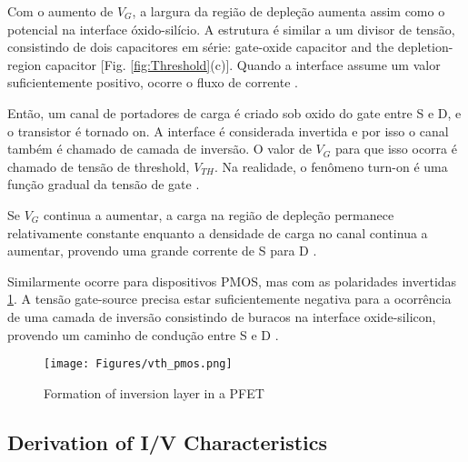 \documentclass[10pt, conference,a4paper]{IEEEtran}
\begin{document}
Com o aumento de $V_G$, a largura da região de depleção aumenta assim como o potencial na interface óxido-silício. A estrutura é similar a um divisor de tensão, consistindo de dois capacitores em série: gate-oxide capacitor and the depletion-region capacitor [Fig. \ref{fig:Threshold}(c)]. Quando a interface assume um valor suficientemente positivo, ocorre o fluxo de corrente \cite{razavi2005design}.

Então, um canal de portadores de carga é criado sob oxido do gate entre S e D, e o transistor é tornado on. A interface é considerada invertida e por isso o canal também é chamado de camada de inversão. O valor de $V_G$ para que isso ocorra é chamado de tensão de threshold, $V_{TH}$. Na realidade, o fenômeno turn-on é uma função gradual da tensão de gate \cite{razavi2005design}. 

Se $V_G$ continua a aumentar, a carga na região de depleção permanece relativamente constante enquanto a densidade de carga no canal continua a aumentar, provendo uma grande corrente de S para D \cite{razavi2005design}.

Similarmente ocorre para dispositivos PMOS, mas com as polaridades invertidas \ref{fig:vth_pmos}. A tensão gate-source precisa estar suficientemente negativa para a ocorrência de uma camada de inversão consistindo de buracos na interface oxide-silicon, provendo um caminho de condução entre S e D \cite{razavi2005design}. 

\begin{figure}[h]
    \centering
    \texttt{[image: Figures/vth\_pmos.png]}
    \caption{Formation of inversion layer in a PFET}
    \label{fig:vth_pmos}
\end{figure}

\subsection{Derivation of I/V Characteristics}
\begin{comment}
O transistor MOS é um dispositivo de quatro terminais: gate, drain, source and body. As Figuras \ref{fig:sch} e \ref{fig:lay} mostram a representação de schematic e layout do Mosfet, respectivamente.

\begin{figure}[h]
    \centering
    \texttt{[image: Figures/mos\_symbol.png]}
    \caption{MOS Symbol}
    \label{fig:sch}
\end{figure}

\begin{figure}[h]
    \centering
    \texttt{[image: Figures/mos\_lay.png]}
    \caption{Structure of a MOS device}
    \label{fig:lay}
\end{figure}
\end{comment}
\end{document}
